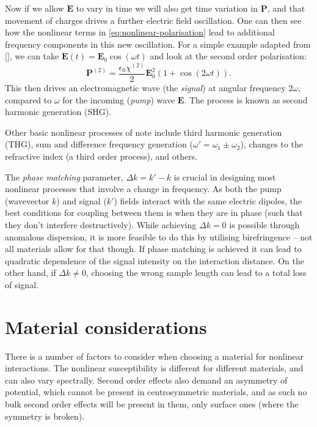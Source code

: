 \documentclass[12pt,a4paper]{article}
\newcommand{\citein}[1]{[\citen{#1}]}
\begin{document}
Now if we allow $\bm{E}$ to vary in time we will also get time variation in $\bm{P}$, and that movement of charges drives a further electric field oscillation. One can then see how the nonlinear terms in \eqref{eq:nonlinear-polarisation} lead to additional frequency components in this new oscillation. For a simple example adapted from \citein{boydNonlinearOptics2008}, we can take $\bm{E}(t)=\bm{E}_0\cos(\omega t)$ and look at the second order polarisation:
\begin{equation}
	\label{eq:example-polarisation}
	\bm{P}^{(2)}=\frac{\epsilon_0\chi^{(2)}}{2}\bm{E}_0^2\left(1+\cos(2\omega t)\right).
\end{equation}
This then drives an electromagnetic wave (the \emph{signal}) at angular frequency $2\omega$, compared to $\omega$ for the incoming (\emph{pump}) wave $\bm{E}$. The process is known as second harmonic generation (SHG).

Other basic nonlinear processes of note include third harmonic generation (THG), sum and difference frequency generation ($\omega'=\omega_1\pm\omega_2$), changes to the refractive index (a third order process), and others\cite{boydNonlinearOptics2008}.

The \emph{phase matching} parameter, $\Delta k = k'-k$ is crucial in designing most nonlinear processes that involve a change in frequency\cite{boydNonlinearOptics2008}. As both the pump (wavevector $k$) and signal ($k'$) fields interact with the same electric dipoles, the best conditions for coupling between them is when they are in phase (such that they don't interfere destructively). While achieving $\Delta k=0$ is possible through anomalous dispersion, it is more feasible to do this by utilising birefringence\cite{raoNonlinearFrequencyConversion2004} -- not all materials allow for that though. If phase matching is achieved it can lead to quadratic dependence of the signal intensity on the interaction distance. On the other hand, if $\Delta k\neq 0$, choosing the wrong sample length can lead to a total loss of signal\cite{boydNonlinearOptics2008}.

\section{Material considerations}
There is a number of factors to consider when choosing a material for nonlinear interactions. The nonlinear susceptibility is different for different materials\cite{burnsThirdHarmonicGenerationAbsorbing1971}, and can also vary spectrally\cite{carnemollaDegenerateOpticalNonlinear2018a}. Second order effects also demand an asymmetry of potential, which cannot be present in centrosymmetric materials, and as such no bulk second order effects will be present in them, only surface ones (where the symmetry is broken)\cite{boydNonlinearOptics2008}.
\end{document}
